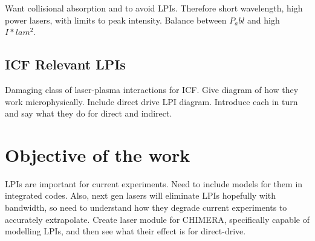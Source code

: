 Want collisional absorption and to avoid LPIs.
Therefore short wavelength, high power lasers, with limits to peak intensity.
Balance between $P_abl$ and high $I*lam^2$.

\subsection{ICF Relevant LPIs}%
\label{sec:intro_LPIs}

Damaging class of laser-plasma interactions for ICF.
Give diagram of how they work microphysically.
Include direct drive LPI diagram.
Introduce each in turn and say what they do for direct and indirect.

\section{Objective of the work}%
\label{sec:intro_objective}

LPIs are important for current experiments.
Need to include models for them in integrated codes.
Also, next gen lasers will eliminate LPIs hopefully with bandwidth, so need to understand how they degrade current experiments to accurately extrapolate.
Create laser module for CHIMERA, specifically capable of modelling LPIs, and then see what their effect is for direct-drive.
